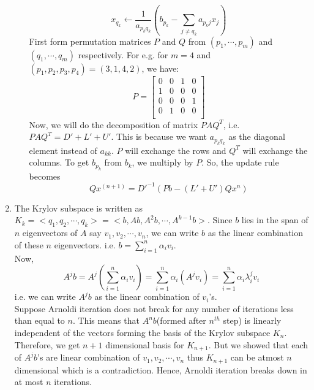 \documentclass{article}
\begin{document}
\begin{enumerate}
\begin{enumerate}[label=(\alph*)]
    $$x_{q_k} \leftarrow \frac{1}{a_{p_kq_k}}(b_{p_k} - \sum\limits_{j \neq q_k}a_{p_kj}x_j)$$
    First form permutation matrices $P$ and $Q$ from $(p_1, \cdots, p_m)$ and $(q_1, \cdots, q_m)$ respectively. For e.g. for $m = 4$ and $(p_1, p_2, p_3, p_4) = (3, 1, 4, 2)$, we have:
    $$P = \begin{bmatrix}
        0 & 0 & 1 & 0 \\
        1 & 0 & 0 & 0 \\
        0 & 0 & 0 & 1 \\
        0 & 1 & 0 & 0 \\
    \end{bmatrix}$$
    Now, we will do the decomposition of matrix $PAQ^T$, i.e. $PAQ^T = D' + L' + U'$. This is because we want $a_{p_kq_k}$ as the diagonal element instead of $a_{kk}$. $P$ will exchange the rows and $Q^T$ will exchange the columns. To get $b_{p_k}$ from $b_k$, we multiply by $P$. So, the update rule becomes
    $$Qx^{(n + 1)} = D'^{-1}(Pb - (L' + U')Qx^n)$$
    \end{enumerate}
    \item The Krylov subspace is written as $K_k = <q_1, q_2, \cdots, q_k> = <b, Ab, A^2b, \cdots, A^{k - 1}b>$. Since $b$ lies in the span of $n$ eigenvectors of $A$ say $v_1, v_2, \cdots, v_n$, we can write $b$ as the linear combination of these $n$ eigenvectors. i.e. $b = \sum\limits_{i = 1}^{n}\alpha_iv_i$.\\
    Now,
    $$A^jb = A^j(\sum\limits_{i = 1}^{n}\alpha_iv_i) = \sum\limits_{i = 1}^n \alpha_i(A^jv_i) = \sum\limits_{i = 1}^{n}\alpha_i\lambda_i^jv_i$$
    i.e. we can write $A^jb$ as the linear combination of $v_i$'s.\\
    Suppose Arnoldi iteration does not break for any number of iterations less than equal to $n$. This means that $A^{n}b$(formed after $n^{th}$ step) is linearly independent of the vectors forming the basis of the Krylov subspace $K_n$. Therefore, we get $n + 1$ dimensional basis for $K_{n + 1}$. But we showed that each of $A^jb$'s are linear combination of $v_1, v_2, \cdots, v_n$ thus $K_{n + 1}$ can be atmost $n$ dimensional which is a contradiction. Hence, Arnoldi iteration breaks down in at most $n$ iterations.\\


\end{enumerate}
\end{document}
